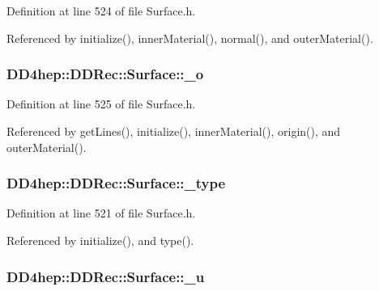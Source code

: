 Definition at line 524 of file Surface.h.

Referenced by initialize(), innerMaterial(), normal(), and outerMaterial().\hypertarget{class_d_d4hep_1_1_d_d_rec_1_1_surface_aab036a2e1a02dcc393f03a901fea39d4}{
\subsubsection[{\_\-o}]{ {\bf DD4hep::DDRec::Surface::\_\-o}}}
\label{class_d_d4hep_1_1_d_d_rec_1_1_surface_aab036a2e1a02dcc393f03a901fea39d4}


Definition at line 525 of file Surface.h.

Referenced by getLines(), initialize(), innerMaterial(), origin(), and outerMaterial().\hypertarget{class_d_d4hep_1_1_d_d_rec_1_1_surface_a1abb4367c088376f8607c45f9faaddb8}{
\subsubsection[{\_\-type}]{ {\bf DD4hep::DDRec::Surface::\_\-type}}}
\label{class_d_d4hep_1_1_d_d_rec_1_1_surface_a1abb4367c088376f8607c45f9faaddb8}


Definition at line 521 of file Surface.h.

Referenced by initialize(), and type().\hypertarget{class_d_d4hep_1_1_d_d_rec_1_1_surface_abbf2e76e33b536bac67c387b860c1ff4}{
\subsubsection[{\_\-u}]{ {\bf DD4hep::DDRec::Surface::\_\-u}}}
\label{class_d_d4hep_1_1_d_d_rec_1_1_surface_abbf2e76e33b536bac67c387b860c1ff4}


